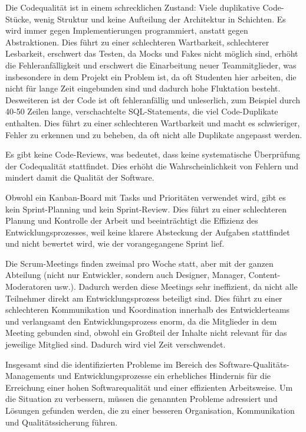 Die Codequalität ist in einem schrecklichen Zustand: Viele duplikative Code-Stücke, 
wenig Struktur und keine Aufteilung der Architektur in Schichten. 
Es wird immer gegen Implementierungen programmiert, anstatt gegen Abstraktionen. 
Dies führt zu einer schlechteren Wartbarkeit, schlechterer Lesbarkeit, 
erschwert das Testen, da Mocks und Fakes nicht möglich sind,  
erhöht die Fehleranfälligkeit und erschwert die Einarbeitung neuer Teammitglieder, 
was insbesondere in dem Projekt ein Problem ist, da oft Studenten hier arbeiten, 
die nicht für lange Zeit eingebunden sind und dadurch hohe Fluktation besteht. \\
Desweiteren ist der Code ist oft fehleranfällig und unleserlich, 
zum Beispiel durch 40-50 Zeilen lange, 
verschachtelte SQL-Statements, die viel Code-Duplikate enthalten. 
Dies führt zu einer schlechteren Wartbarkeit und macht es schwieriger, 
Fehler zu erkennen und zu beheben, da oft nicht alle Duplikate angepasst werden.

Es gibt keine Code-Reviews, was bedeutet, dass keine systematische Überprüfung der Codequalität 
stattfindet. Dies erhöht die Wahrscheinlichkeit von Fehlern und mindert damit die Qualität der Software.

Obwohl ein Kanban-Board mit Tasks und Prioritäten verwendet wird, 
gibt es kein Sprint-Planning und kein Sprint-Review. 
Dies führt zu einer schlechteren Planung und Kontrolle der Arbeit 
und beeinträchtigt die Effizienz des Entwicklungsprozesses, weil keine klarere Absteckung der 
Aufgaben stattfindet und nicht bewertet wird, wie der vorangegangene Sprint lief.

Die Scrum-Meetings finden zweimal pro Woche statt, 
aber mit der ganzen Abteilung (nicht nur Entwickler, sondern auch Designer, Manager, Content-Moderatoren usw.). 
Dadurch werden diese Meetings sehr ineffizient, 
da nicht alle Teilnehmer direkt am Entwicklungsprozess beteiligt sind. 
Dies führt zu einer schlechteren Kommunikation und Koordination innerhalb des Entwicklerteams 
und verlangsamt den Entwicklungsprozess enorm, da die Mitglieder in dem Meeting gebunden sind, 
obwohl ein Großteil der Inhalte nicht relevant für das jeweilige Mitglied sind. 
Dadurch wird viel Zeit verschwendet.

Insgesamt sind die identifizierten Probleme im Bereich des Software-Qualitäts-Managements
und Entwicklungsprozesse ein erhebliches Hindernis für die Erreichung einer 
hohen Softwarequalität und einer effizienten Arbeitsweise. Um die Situation zu verbessern, 
müssen die genannten Probleme adressiert und Lösungen gefunden werden, 
die zu einer besseren Organisation, Kommunikation und Qualitätssicherung führen.

